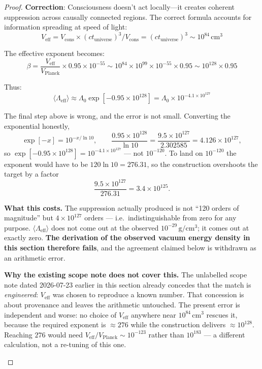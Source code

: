\begin{proof}
\textbf{Correction}: Consciousness doesn't act locally—it creates coherent suppression across causally connected regions. The correct formula accounts for information spreading at speed of light:
\begin{equation}
V_{\text{eff}} = V_{\text{cons}} \times (ct_{\text{universe}})^3 / V_{\text{cons}} = (ct_{\text{universe}})^3 \sim 10^{84} \, \text{cm}^3
\end{equation}

The effective exponent becomes:
\begin{equation}
\beta = \frac{V_{\text{eff}}}{V_{\text{Planck}}} \times 0.95 \times 10^{-55} \sim 10^{84} \times 10^{99} \times 10^{-55} \times 0.95 \sim 10^{128} \times 0.95
\end{equation}

Thus:
\begin{equation}
\langle \Lambda_{\text{eff}} \rangle \approx \Lambda_0 \exp[-0.95 \times 10^{128}]
= \Lambda_0 \times 10^{-4.1 \times 10^{127}}
\end{equation}

\begin{remark}
\label{rem:lambda-exponent-2026-10-03}
The final step above is wrong, and the error is not small. Converting the
exponential honestly,
\begin{equation}
\exp[-x] = 10^{-x/\ln 10}, \qquad
\frac{0.95 \times 10^{128}}{\ln 10} = \frac{9.5 \times 10^{127}}{2.302585}
= 4.126 \times 10^{127},
\end{equation}
so $\exp[-0.95 \times 10^{128}] = 10^{-4.1 \times 10^{127}}$ --- not $10^{-120}$.
To land on $10^{-120}$ the exponent would have to be
$120 \ln 10 = 276.31$, so the construction overshoots the target by a factor
\begin{equation}
\frac{9.5 \times 10^{127}}{276.31} = 3.4 \times 10^{125}.
\end{equation}

\textbf{What this costs.} The suppression actually produced is not ``120 orders of
magnitude'' but $4 \times 10^{127}$ orders --- i.e.\ indistinguishable from zero for
any purpose. $\langle \Lambda_{\text{eff}} \rangle$ does not come out at the
observed $10^{-29}\,\mathrm{g/cm^3}$; it comes out at exactly zero. \textbf{The
derivation of the observed vacuum energy density in this section therefore fails},
and the agreement claimed below is withdrawn as an arithmetic error.

\textbf{Why the existing scope note does not cover this.} The unlabelled scope note dated 2026-07-23 earlier in this
section already concedes that the match is \emph{engineered}:
$V_{\text{eff}}$ was chosen to reproduce a known number. That concession is about
provenance and leaves the arithmetic untouched. The present error is independent
and worse: no choice of $V_{\text{eff}}$ anywhere near $10^{84}\,\mathrm{cm^3}$
rescues it, because the required exponent is $\approx 276$ while the construction
delivers $\approx 10^{128}$. Reaching $276$ would need
$V_{\text{eff}}/V_{\text{Planck}} \sim 10^{-123}$ rather than $10^{183}$ --- a
different calculation, not a re-tuning of this one.


\end{remark}
\end{proof}
